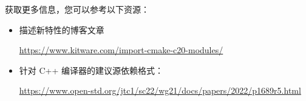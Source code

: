 获取更多信息，您可以参考以下资源：

\begin{itemize}
\item
描述新特性的博客文章

\url{https://www.kitware.com/import-cmake-c20-modules/}

\item
针对 C++ 编译器的建议源依赖格式：

\url{https://www.open-std.org/jtc1/sc22/wg21/docs/papers/2022/p1689r5.html}
\end{itemize}